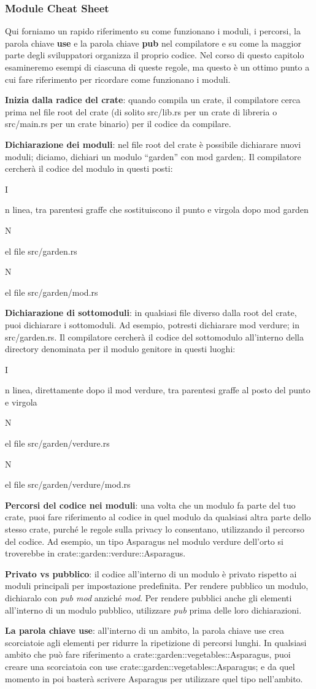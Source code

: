 \documentclass[11pt,a4paper]{article}
\newcommand{\SubItem}[1]{
    {\setlength\itemindent{15pt} \item[-] #1}
}
\begin{document}
\subsubsection{Module Cheat Sheet}
Qui forniamo un rapido riferimento su come funzionano i moduli, i percorsi, la parola chiave \textbf{use} e la parola chiave \textbf{pub} nel compilatore e su come la maggior parte degli sviluppatori organizza il proprio codice. Nel corso di questo capitolo esamineremo esempi di ciascuna di queste regole, ma questo è un ottimo punto a cui fare riferimento per ricordare come funzionano i moduli.
\begin{itemize}
\item \textbf{Inizia dalla radice del crate}: quando compila un crate, il compilatore cerca prima nel file root del crate (di solito src/lib.rs per un crate di libreria o src/main.rs per un crate binario) per il codice da compilare.
\item \textbf{Dichiarazione dei moduli}: nel file root del crate è possibile dichiarare nuovi moduli; diciamo, dichiari un modulo “garden” con mod garden;. Il compilatore cercherà il codice del modulo in questi posti:
\SubItem In linea, tra parentesi graffe che sostituiscono il punto e virgola dopo mod garden
\SubItem Nel file src/garden.rs
\SubItem Nel file src/garden/mod.rs
\item \textbf{Dichiarazione di sottomoduli}: in qualsiasi file diverso dalla root del crate, puoi dichiarare i sottomoduli. Ad esempio, potresti dichiarare mod verdure; in src/garden.rs. Il compilatore cercherà il codice del sottomodulo all'interno della directory denominata per il modulo genitore in questi luoghi:
\SubItem In linea, direttamente dopo il mod verdure, tra parentesi graffe al posto del punto e virgola
\SubItem Nel file src/garden/verdure.rs
\SubItem Nel file src/garden/verdure/mod.rs
\item \textbf{Percorsi del codice nei moduli}: una volta che un modulo fa parte del tuo crate, puoi fare riferimento al codice in quel modulo da qualsiasi altra parte dello stesso crate, purché le regole sulla privacy lo consentano, utilizzando il percorso del codice. Ad esempio, un tipo Asparagus nel modulo verdure dell'orto si troverebbe in crate::garden::verdure::Asparagus.
\item \textbf{Privato vs pubblico}: il codice all'interno di un modulo è privato rispetto ai moduli principali per impostazione predefinita. Per rendere pubblico un modulo, dichiaralo con \textit{pub mod} anziché \textit{mod}. Per rendere pubblici anche gli elementi all'interno di un modulo pubblico, utilizzare \textit{pub} prima delle loro dichiarazioni.
\item \textbf{La parola chiave use}: all'interno di un ambito, la parola chiave use crea scorciatoie agli elementi per ridurre la ripetizione di percorsi lunghi. In qualsiasi ambito che può fare riferimento a crate::garden::vegetables::Asparagus, puoi creare una scorciatoia con use crate::garden::vegetables::Asparagus; e da quel momento in poi basterà scrivere Asparagus per utilizzare quel tipo nell'ambito.
\end{itemize}
\end{document}

